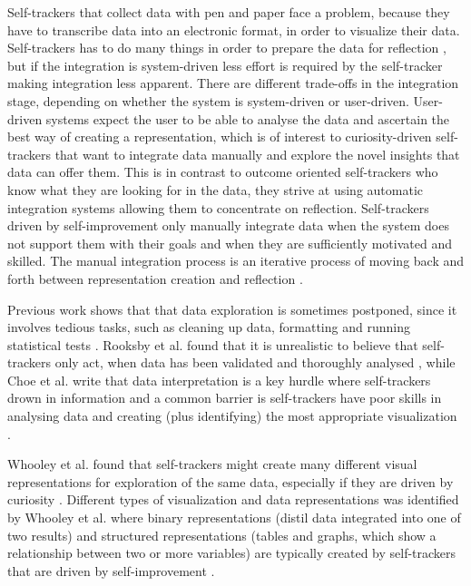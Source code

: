 Self-trackers that collect data with pen and paper face a problem, because they have to transcribe data into an electronic format, in order to visualize their data. Self-trackers has to do many things in order to prepare the data for reflection \citep{Li2010}, but if the integration is system-driven less effort is required by the self-tracker \citep{Li2011, Whooley2014} making integration less apparent. There are different trade-offs in the integration stage, depending on whether the system is system-driven or user-driven. User-driven systems expect the user to be able to analyse the data and ascertain the best way of creating a representation, which is of interest to curiosity-driven self-trackers that want to integrate data manually and explore the novel insights that data can offer them. This is in contrast to outcome oriented self-trackers who know what they are looking for in the data, they strive at using automatic integration systems allowing them to concentrate on reflection. Self-trackers driven by self-improvement only manually integrate data when the system does not support them with their goals and when they are sufficiently motivated and skilled. The manual integration process is an iterative process of moving back and forth between representation creation and reflection \citep{Whooley2014}. 

Previous work shows that that data exploration is sometimes postponed, since it involves tedious tasks, such as cleaning up data, formatting and running statistical tests \citep{Choe2014, Chung2015, Li2010}. Rooksby et al. found that it is unrealistic to believe that self-trackers only act, when data has been validated and thoroughly analysed \citep{Rooksby}, while Choe et al. write that data interpretation is a key hurdle where self-trackers drown in information and a common barrier is self-trackers have poor skills in analysing data and creating (plus identifying) the most appropriate visualization \citep{Choe2014}. 

Whooley et al. found that self-trackers might create many different visual representations for exploration of the same data, especially if they are driven by curiosity \citep{Whooley2014}. 
Different types of visualization and data representations was identified by Whooley et al. where binary representations (distil data integrated into one of two results) and structured representations (tables and graphs, which show a relationship between two or more variables) are typically created by self-trackers that are driven by self-improvement \citep{Whooley2014}.

